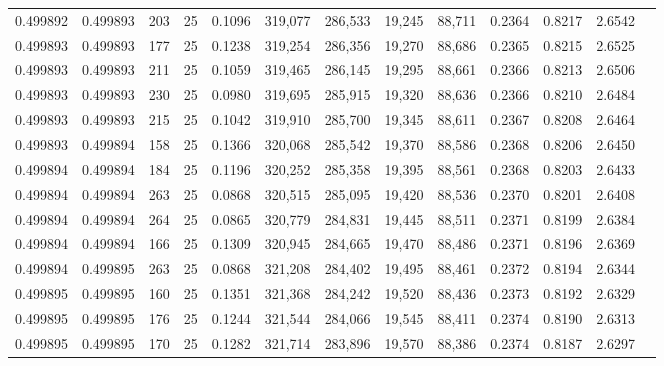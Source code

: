 \begin{tabular}{rrrrrrrrrrrrr}
0.499892 & 0.499893 &   203 &  25 &                                     0.1096 & 319,077 & 286,533 &  19,245 &  88,711 & 0.2364 & 0.8217 & 2.6542 \\
0.499893 & 0.499893 &   177 &  25 &                                     0.1238 & 319,254 & 286,356 &  19,270 &  88,686 & 0.2365 & 0.8215 & 2.6525 \\
0.499893 & 0.499893 &   211 &  25 &                                     0.1059 & 319,465 & 286,145 &  19,295 &  88,661 & 0.2366 & 0.8213 & 2.6506 \\
0.499893 & 0.499893 &   230 &  25 &                                     0.0980 & 319,695 & 285,915 &  19,320 &  88,636 & 0.2366 & 0.8210 & 2.6484 \\
0.499893 & 0.499893 &   215 &  25 &                                     0.1042 & 319,910 & 285,700 &  19,345 &  88,611 & 0.2367 & 0.8208 & 2.6464 \\
0.499893 & 0.499894 &   158 &  25 &                                     0.1366 & 320,068 & 285,542 &  19,370 &  88,586 & 0.2368 & 0.8206 & 2.6450 \\
0.499894 & 0.499894 &   184 &  25 &                                     0.1196 & 320,252 & 285,358 &  19,395 &  88,561 & 0.2368 & 0.8203 & 2.6433 \\
0.499894 & 0.499894 &   263 &  25 &                                     0.0868 & 320,515 & 285,095 &  19,420 &  88,536 & 0.2370 & 0.8201 & 2.6408 \\
0.499894 & 0.499894 &   264 &  25 &                                     0.0865 & 320,779 & 284,831 &  19,445 &  88,511 & 0.2371 & 0.8199 & 2.6384 \\
0.499894 & 0.499894 &   166 &  25 &                                     0.1309 & 320,945 & 284,665 &  19,470 &  88,486 & 0.2371 & 0.8196 & 2.6369 \\
0.499894 & 0.499895 &   263 &  25 &                                     0.0868 & 321,208 & 284,402 &  19,495 &  88,461 & 0.2372 & 0.8194 & 2.6344 \\
0.499895 & 0.499895 &   160 &  25 &                                     0.1351 & 321,368 & 284,242 &  19,520 &  88,436 & 0.2373 & 0.8192 & 2.6329 \\
0.499895 & 0.499895 &   176 &  25 &                                     0.1244 & 321,544 & 284,066 &  19,545 &  88,411 & 0.2374 & 0.8190 & 2.6313 \\
0.499895 & 0.499895 &   170 &  25 &                                     0.1282 & 321,714 & 283,896 &  19,570 &  88,386 & 0.2374 & 0.8187 & 2.6297 \\

\end{tabular}
